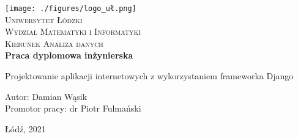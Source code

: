 
\newpage
\thispagestyle{empty}





\begin{onehalfspacing}
\begin{center}

\centering
\texttt{[image: ./figures/logo\_uł.png]} \\[.8cm]


{\fontsize{17}{17}\selectfont
\textsc{Uniwersytet Łódzki \\[.3cm]
Wydział Matematyki i Informatyki  \\[.3cm]
Kierunek Analiza danych  \\[2.5cm]}
\textbf{Praca dyplomowa inżynierska \\[1.7cm]}}



\large 
{Projektowanie aplikacji internetowych z wykorzystaniem frameworka Django} \\[2.3cm]


\large
\begin{flushleft}
Autor: Damian Wąsik  \\
Promotor pracy:  dr Piotr Fulmański \\
\end{flushleft}

\vspace{3cm}
Łódź, 2021
\end{center}
\end{onehalfspacing}






\setcounter{page}{0} \pagestyle{plain}


\tableofcontents




\pagestyle{fancy}